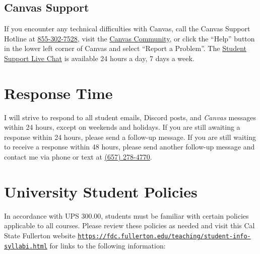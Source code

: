 \documentclass[11pt, letterpaper]{article}
\begin{document}
\subsection*{Canvas Support}

If you encounter any technical difficulties with Canvas, call the Canvas Support Hotline at \href{tel:+18553027528}{855-302-7528}, visit the \href{https://community.canvaslms.com/docs/DOC-10720-67952720329}{Canvas Community}, or click the ``Help'' button in the lower left corner of Canvas and select ``Report a Problem''. The \href{https://cases.canvaslms.com/liveagentchat?chattype=student&sfid=001A000000YzcwQIAR}{Student Support Live Chat} is available 24 hours a day, 7 days a week.

\section{Response Time} I will strive to respond to all student emails, Discord posts, and \emph{Canvas} messages within 24 hours, except on weekends and holidays. If you are still awaiting a response within 24 hours, please send a follow-up message. If you are still waiting to receive a response within 48 hours, please send another follow-up message and contact me via phone or text at \href{tel:+16572784770}{(657) 278-4770}.


\section{University Student Policies}

In accordance with UPS 300.00, students must be familiar with certain policies applicable to all courses. Please review these policies as needed and visit this Cal State Fullerton website \texttt{\href{https://fdc.fullerton.edu/teaching/student-info-syllabi.html}{https://fdc.fullerton.edu/teaching/student-info-syllabi.html}} for links to the following information:
\end{document}
